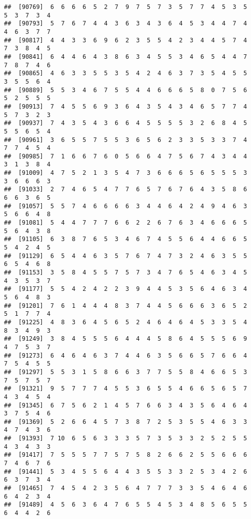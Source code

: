 \documentclass[
]{book}
\begin{document}
\begin{verbatim}
##  [90769]  6  6  6  6  5  2  7  9  7  5  7  3  5  7  7  4  5  3  5  5  3  7  3  4
##  [90793]  5  7  6  7  4  4  3  6  3  4  3  6  4  5  3  4  4  7  4  4  6  3  7  7
##  [90817]  4  4  3  3  6  9  6  2  3  5  5  4  2  3  4  4  5  7  4  7  3  8  4  5
##  [90841]  6  4  4  6  4  3  8  6  3  4  5  5  3  4  6  5  4  4  7  7  8  7  4  6
##  [90865]  4  6  3  3  5  5  3  5  4  2  4  6  3  7  3  5  4  5  5  3  5  5  6  4
##  [90889]  5  5  3  4  6  7  5  5  4  4  6  6  6  5  8  0  7  5  6  5  2  5  5  5
##  [90913]  7  4  5  5  6  9  3  6  4  3  5  4  3  4  6  5  7  7  4  5  7  3  2  3
##  [90937]  7  4  3  5  4  3  6  6  4  5  5  5  5  3  2  6  8  4  5  5  5  6  5  4
##  [90961]  3  6  5  5  7  5  5  3  6  5  6  2  3  3  5  3  3  7  4  7  7  4  5  4
##  [90985]  7  1  6  6  7  6  0  5  6  6  4  7  5  6  7  4  3  4  4  3  1  3  8  4
##  [91009]  4  7  5  2  1  3  5  4  7  3  6  6  6  5  6  5  5  5  3  3  6  6  6  3
##  [91033]  2  7  4  6  5  4  7  7  6  5  7  6  7  6  4  3  5  8  6  6  6  3  6  5
##  [91057]  5  5  7  4  6  6  6  6  3  4  4  6  4  2  4  9  4  6  3  5  6  6  4  8
##  [91081]  5  4  4  7  7  7  6  6  2  2  6  7  6  3  4  6  6  6  5  5  6  4  3  8
##  [91105]  6  3  8  7  6  5  3  4  6  7  4  5  5  6  4  4  6  6  5  5  4  2  4  5
##  [91129]  6  5  4  4  6  3  5  7  6  7  4  7  3  2  4  6  3  5  5  6  5  4  6  8
##  [91153]  3  5  8  4  5  5  7  5  7  3  4  7  6  5  4  6  3  4  5  4  3  5  3  7
##  [91177]  5  5  4  2  4  2  2  3  9  4  4  5  3  5  6  4  6  3  4  5  6  4  8  3
##  [91201]  7  6  1  4  4  4  8  3  7  4  4  5  6  6  6  3  6  5  2  5  1  7  7  4
##  [91225]  4  8  3  6  4  5  6  5  2  4  6  4  6  4  5  3  3  5  4  8  3  4  9  3
##  [91249]  3  8  4  5  5  5  6  4  4  4  5  8  6  4  5  5  5  6  9  4  7  5  3  7
##  [91273]  6  4  6  4  6  3  7  4  4  6  3  5  6  6  5  7  6  6  4  7  5  4  5  5
##  [91297]  5  5  3  1  5  8  6  6  3  7  7  5  5  8  4  6  6  5  3  7  5  7  5  7
##  [91321]  9  5  7  7  7  4  5  5  3  6  5  5  4  6  6  5  6  5  7  4  3  4  5  4
##  [91345]  6  7  5  6  2  1  4  5  7  6  6  3  4  3  5  6  4  6  4  3  7  5  4  6
##  [91369]  5  2  6  6  4  5  7  3  8  7  2  5  3  5  5  4  6  3  3  4  7  4  3  6
##  [91393]  7 10  6  5  6  3  3  3  5  7  3  5  3  3  2  5  2  5  5  4  3  4  3  3
##  [91417]  7  5  5  5  7  7  5  7  5  8  2  6  6  2  5  5  6  6  6  7  4  6  7  6
##  [91441]  5  3  4  5  5  6  4  4  3  5  5  3  3  2  5  3  4  2  6  6  3  7  3  4
##  [91465]  7  4  5  4  2  3  5  6  4  7  7  7  3  3  5  4  6  4  6  6  4  2  3  4
##  [91489]  4  5  6  3  6  4  7  6  5  5  4  5  3  4  8  5  6  5  5  6  4  4  2  6

\end{verbatim}
\end{document}
